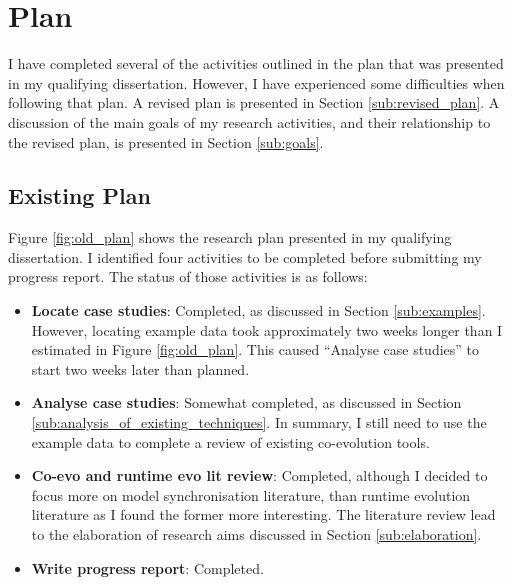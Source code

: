 \section{Plan}
I have completed several of the activities outlined in the plan that was presented in my qualifying dissertation. However, I have experienced some difficulties when following that plan. A revised plan is presented in Section \ref{sub:revised_plan}. A discussion of the main goals of my research activities, and their relationship to the revised plan, is presented in Section \ref{sub:goals}.


\subsection{Existing Plan}
\label{sub:existing_plan}
Figure \ref{fig:old_plan} shows the research plan presented in my qualifying dissertation. I identified four activities to be completed before submitting my progress report. The status of those activities is as follows:

\begin{itemize}
	\item \textbf{Locate case studies}: Completed, as discussed in Section \ref{sub:examples}. However, locating example data took approximately two weeks longer than I estimated in Figure \ref{fig:old_plan}. This caused ``Analyse case studies'' to start two weeks later than planned.
	\item \textbf{Analyse case studies}: Somewhat completed, as discussed in Section \ref{sub:analysis_of_existing_techniques}. In summary, I still need to use the example data to complete a review of existing co-evolution tools.
	\item \textbf{Co-evo and runtime evo lit review}: Completed, although I decided to focus more on model synchronisation literature, than runtime evolution literature as I found the former more interesting. The literature review lead to the elaboration of research aims discussed in Section \ref{sub:elaboration}.
	\item \textbf{Write progress report}: Completed.
\end{itemize}

